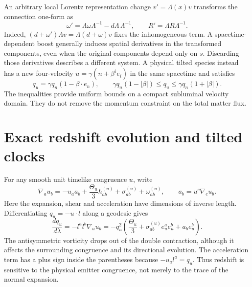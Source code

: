 An arbitrary local Lorentz representation change $v'=\Lambda(x)v$ transforms the connection one-form as
\begin{equation}\label{vii:local_boost_connection}
\omega'=\Lambda\omega\Lambda^{-1}-d\Lambda\,\Lambda^{-1},
\qquad R'=\Lambda R\Lambda^{-1}.
\end{equation}
Indeed, $(d+\omega')\Lambda v=\Lambda(d+\omega)v$ fixes the inhomogeneous term. A spacetime-dependent boost generally induces spatial derivatives in the transformed components, even when the original components depend only on $s$. Discarding those derivatives describes a different system. A physical tilted species instead has a new four-velocity $u=\gamma(n+\beta^ie_i)$ in the same spacetime and satisfies
\begin{equation}\label{vii:tilted_energy}
q_u=\gamma q_n(1-\beta\cdot e_n),\qquad
\gamma q_n(1-|\beta|)\le q_u\le\gamma q_n(1+|\beta|).
\end{equation}
The inequalities provide uniform bounds on a compact subluminal velocity domain. They do not remove the momentum constraint on the total matter flux.

\section{Exact redshift evolution and tilted clocks}
For any smooth unit timelike congruence $u$, write
\begin{equation}\label{vii:congruence_decomposition}
\nabla_a u_b=-u_a a_b+\frac{\Theta_u}{3}h^{(u)}_{ab}
+\sigma^{(u)}_{ab}+\omega^{(u)}_{ab},\qquad a_b=u^c\nabla_cu_b.
\end{equation}
Here the expansion, shear and acceleration have dimensions of inverse length. Differentiating $q_u=-u\cdot l$ along a geodesic gives
\begin{equation}\label{vii:exact_redshift_rate}
\frac{dq_u}{d\lambda}=-l^al^b\nabla_a u_b
=-q_u^2\left(\frac{\Theta_u}{3}+\sigma^{(u)}_{ab}e_u^ae_u^b+a_be_u^b\right).
\end{equation}
The antisymmetric vorticity drops out of the double contraction, although it affects the surrounding congruence and its directional evolution. The acceleration term has a plus sign inside the parentheses because $-u_a l^a=q_u$. Thus redshift is sensitive to the physical emitter congruence, not merely to the trace of the normal expansion.

